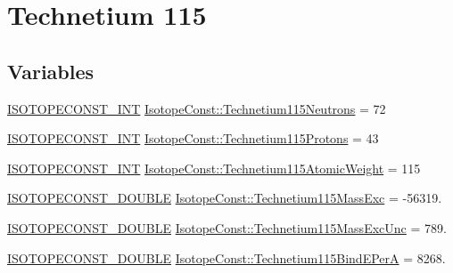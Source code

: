 \hypertarget{group___isotope_const-_technetium-_tc115}{}\section{Technetium 115}
\label{group___isotope_const-_technetium-_tc115}
\subsection*{Variables}
\begin{DoxyCompactItemize}
\item 
\mbox{\hyperlink{group___isotope_const-_macros_ga5f18360b3e99483a35c32d789e62621c}{I\+S\+O\+T\+O\+P\+E\+C\+O\+N\+S\+T\+\_\+\+I\+NT}} \mbox{\hyperlink{group___isotope_const-_technetium-_tc115_ga88d6494344fab3497b622109687c275a}{Isotope\+Const\+::\+Technetium115\+Neutrons}} = 72
\item 
\mbox{\hyperlink{group___isotope_const-_macros_ga5f18360b3e99483a35c32d789e62621c}{I\+S\+O\+T\+O\+P\+E\+C\+O\+N\+S\+T\+\_\+\+I\+NT}} \mbox{\hyperlink{group___isotope_const-_technetium-_tc115_ga78d9b04b8e5ffdc5a5f856dbb1a304ee}{Isotope\+Const\+::\+Technetium115\+Protons}} = 43
\item 
\mbox{\hyperlink{group___isotope_const-_macros_ga5f18360b3e99483a35c32d789e62621c}{I\+S\+O\+T\+O\+P\+E\+C\+O\+N\+S\+T\+\_\+\+I\+NT}} \mbox{\hyperlink{group___isotope_const-_technetium-_tc115_gac10cfa21a1fa81769ac1ea762165b5f2}{Isotope\+Const\+::\+Technetium115\+Atomic\+Weight}} = 115
\item 
\mbox{\hyperlink{group___isotope_const-_macros_ga8f45a7272ce02c0b4c65c44636ed719a}{I\+S\+O\+T\+O\+P\+E\+C\+O\+N\+S\+T\+\_\+\+D\+O\+U\+B\+LE}} \mbox{\hyperlink{group___isotope_const-_technetium-_tc115_gaebed5f7ec71d2ce1df4b9e2437b5f351}{Isotope\+Const\+::\+Technetium115\+Mass\+Exc}} = -\/56319.
\item 
\mbox{\hyperlink{group___isotope_const-_macros_ga8f45a7272ce02c0b4c65c44636ed719a}{I\+S\+O\+T\+O\+P\+E\+C\+O\+N\+S\+T\+\_\+\+D\+O\+U\+B\+LE}} \mbox{\hyperlink{group___isotope_const-_technetium-_tc115_gaed3bbd10f777a5ab6a79693607b36a68}{Isotope\+Const\+::\+Technetium115\+Mass\+Exc\+Unc}} = 789.
\item 
\mbox{\hyperlink{group___isotope_const-_macros_ga8f45a7272ce02c0b4c65c44636ed719a}{I\+S\+O\+T\+O\+P\+E\+C\+O\+N\+S\+T\+\_\+\+D\+O\+U\+B\+LE}} \mbox{\hyperlink{group___isotope_const-_technetium-_tc115_ga145e21288cfaefc792079328df9c9a35}{Isotope\+Const\+::\+Technetium115\+Bind\+E\+PerA}} = 8268.

\end{DoxyCompactItemize}
